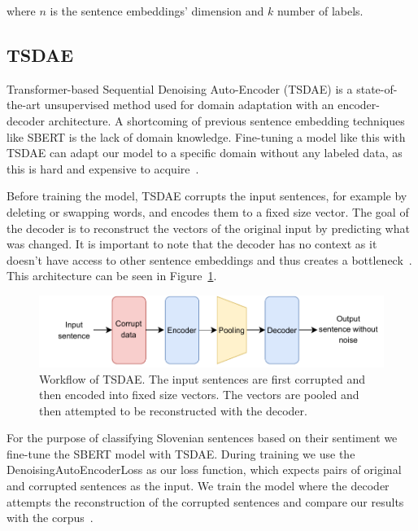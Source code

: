 \documentclass[fleqn,moreauthors,10pt]{ds_report}
\begin{document}
where $n$ is the sentence embeddings' dimension and $k$ number of labels.


\subsection*{TSDAE}

Transformer-based Sequential Denoising Auto-Encoder (TSDAE) is a state-of-the-art unsupervised method used for domain adaptation with an encoder-decoder architecture. A shortcoming of previous sentence embedding techniques like SBERT is the lack of domain knowledge. Fine-tuning a model like this with TSDAE can adapt our model to a specific domain without any labeled data, as this is hard and expensive to acquire~\cite{wang-etal-2021-tsdae-using}.

Before training the model, TSDAE corrupts the input sentences, for example by deleting or swapping words, and encodes them to a fixed size vector. The goal of the decoder is to reconstruct the vectors of the original input by predicting what was changed. It is important to note that the decoder has no context as it doesn't have access to other sentence embeddings and thus creates a bottleneck~\cite{wang-etal-2021-tsdae-using}. This architecture can be seen in Figure~\ref{fig:tsdae}.

\begin{figure}[ht]\centering
	\vspace{12 pt}
	\includegraphics[width=\linewidth]{TSDAE_scheme.pdf}
	\vspace{5 pt}
	\caption{Workflow of TSDAE. The input sentences are first corrupted and then encoded into fixed size vectors. The vectors are pooled and then attempted to be reconstructed with the decoder.}
	\label{fig:tsdae}
\end{figure}

For the purpose of classifying Slovenian sentences based on their sentiment we fine-tune the SBERT model with TSDAE. During training we use the DenoisingAutoEncoderLoss as our loss function, which expects pairs of original and corrupted sentences as the input. We train the model where the decoder attempts the reconstruction of the corrupted sentences and compare our results with the corpus~\cite{SentenceTransformers}.
\end{document}
